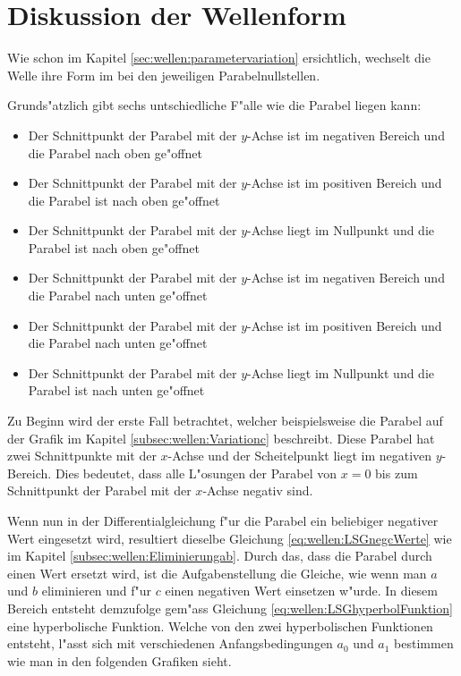 \section{Diskussion der Wellenform}
\label{sec:wellen:diskussionwellenform}

Wie schon im Kapitel \ref{sec:wellen:parametervariation} ersichtlich, 
wechselt die Welle ihre Form im bei den jeweiligen Parabelnullstellen.

Grunds"atzlich gibt sechs untschiedliche F"alle wie die Parabel liegen kann:
\begin{itemize}
	\item Der Schnittpunkt der Parabel mit der $y$-Achse ist im negativen 
	Bereich und die Parabel nach oben ge"offnet
	\item Der Schnittpunkt der Parabel mit der $y$-Achse ist im positiven 
	Bereich und die Parabel ist nach oben ge"offnet
	\item Der Schnittpunkt der Parabel mit der $y$-Achse liegt im Nullpunkt und 
	die Parabel ist nach oben ge"offnet
	\item Der Schnittpunkt der Parabel mit der $y$-Achse ist im negativen 
	Bereich und die Parabel nach unten ge"offnet
	\item Der Schnittpunkt der Parabel mit der $y$-Achse ist im positiven 
	Bereich und die Parabel nach unten ge"offnet
	\item Der Schnittpunkt der Parabel mit der $y$-Achse liegt im Nullpunkt und 
	die Parabel ist nach unten ge"offnet
\end{itemize}

Zu Beginn wird der erste Fall betrachtet, welcher beispielsweise die Parabel 
auf der Grafik im Kapitel \ref{subsec:wellen:Variationc} beschreibt. Diese 
Parabel hat 
zwei Schnittpunkte mit der $x$-Achse und der Scheitelpunkt liegt im negativen 
$y$-Bereich. Dies bedeutet, dass alle L"osungen der Parabel von $x=0$ bis zum 
Schnittpunkt der Parabel mit der $x$-Achse negativ sind. 

Wenn nun in der Differentialgleichung f"ur die Parabel ein beliebiger negativer 
Wert eingesetzt wird, resultiert dieselbe Gleichung 
\ref{eq:wellen:LSGnegcWerte} 
wie im Kapitel \ref{subsec:wellen:Eliminierungab}. Durch das, dass die Parabel 
durch 
einen Wert ersetzt wird, ist die Aufgabenstellung die Gleiche, wie wenn man $a$ 
und $b$ eliminieren und f"ur $c$ einen negativen Wert einsetzen w"urde. In 
diesem Bereich entsteht demzufolge gem"ass Gleichung 
\ref{eq:wellen:LSGhyperbolFunktion} eine hyperbolische Funktion. Welche von den 
zwei hyperbolischen Funktionen entsteht, l"asst sich mit verschiedenen 
Anfangsbedingungen $a_0$ und $a_1$ bestimmen wie man in den folgenden Grafiken 
sieht.

